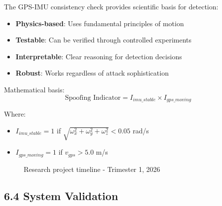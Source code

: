 The GPS-IMU consistency check provides scientific basis for detection:

\begin{itemize}
    \item \textbf{Physics-based}: Uses fundamental principles of motion
    \item \textbf{Testable}: Can be verified through controlled experiments
    \item \textbf{Interpretable}: Clear reasoning for detection decisions
    \item \textbf{Robust}: Works regardless of attack sophistication
\end{itemize}

Mathematical basis:
\begin{equation}
\text{Spoofing Indicator} = I_{imu\_stable} \times I_{gps\_moving}
\end{equation}

Where:
\begin{itemize}
    \item $I_{imu\_stable} = 1$ if $\sqrt{\omega_x^2 + \omega_y^2 + \omega_z^2} < 0.05$ rad/s
\item $I_{gps\_moving} = 1$ if $v_{gps} > 5.0$ m/s
\end{itemize}

\begin{figure}[htbp]
    \centering
    \caption{Research project timeline - Trimester 1, 2026}
    \label{fig:timeline_graph}
\end{figure}

\subsection{6.4 System Validation}

